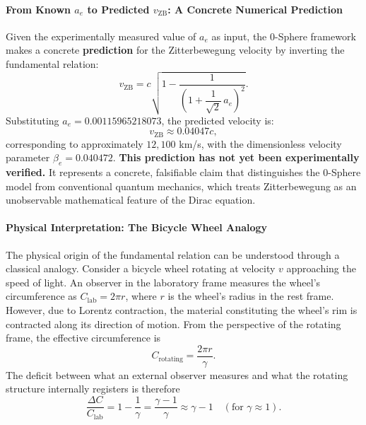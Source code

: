\documentclass[12pt,letterpaper]{article}
\begin{document}
\paragraph{From Known $a_e$ to Predicted $v_{\mathrm{ZB}}$: A Concrete Numerical Prediction}

Given the experimentally measured value of $a_e$ as input, the 0-Sphere framework makes a concrete \textbf{prediction} for the Zitterbewegung velocity by inverting the fundamental relation:
\begin{equation}
  v_{\mathrm{ZB}} = c\sqrt{1 - \frac{1}{\left(1 + \dfrac{1}{\sqrt{2}}\,a_e\right)^{\!2}}}.
\end{equation}
Substituting $a_e = 0.00115965218073$, the predicted velocity is:
\begin{equation}
  v_{\mathrm{ZB}} \approx 0.04047c,
\end{equation}
corresponding to approximately $12{,}100$ km/s, with the dimensionless velocity parameter $\beta_e = 0.040472$. \textbf{This prediction has not yet been experimentally verified.} It represents a concrete, falsifiable claim that distinguishes the 0-Sphere model from conventional quantum mechanics, which treats Zitterbewegung as an unobservable mathematical feature of the Dirac equation.

\paragraph{Physical Interpretation: The Bicycle Wheel Analogy}

The physical origin of the fundamental relation can be understood through a classical analogy. Consider a bicycle wheel rotating at velocity $v$ approaching the speed of light. An observer in the laboratory frame measures the wheel's circumference as $C_{\mathrm{lab}} = 2\pi r$, where $r$ is the wheel's radius in the rest frame. However, due to Lorentz contraction, the material constituting the wheel's rim is contracted along its direction of motion. From the perspective of the rotating frame, the effective circumference is
\begin{equation}
  C_{\mathrm{rotating}} = \frac{2\pi r}{\gamma}.
\end{equation}
The deficit between what an external observer measures and what the rotating structure internally registers is therefore
\begin{equation}
  \frac{\Delta C}{C_{\mathrm{lab}}} = 1 - \frac{1}{\gamma} = \frac{\gamma - 1}{\gamma} \approx \gamma - 1 \quad (\text{for } \gamma \approx 1).
\end{equation}
\end{document}
